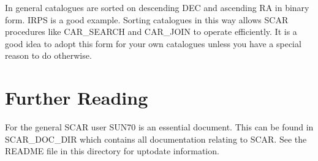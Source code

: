In general catalogues are sorted on descending DEC and ascending RA in binary
form. IRPS is a good example. Sorting catalogues in this way allows SCAR 
procedures like CAR\_SEARCH and CAR\_JOIN to operate efficiently. It is a good 
idea to adopt this form for your own catalogues unless you have a special 
reason to do otherwise.


\section{Further Reading}

For the general SCAR user SUN70 is an essential document. This can be found in
SCAR\_DOC\_DIR which contains all documentation relating to SCAR. See the
README file in this directory for uptodate information.


